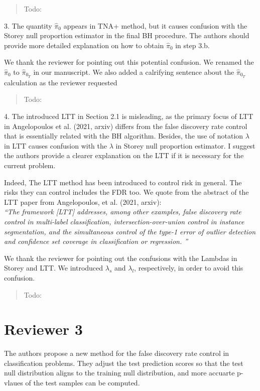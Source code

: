 \documentclass{article}
\newcommand{\response}[1]{\vspace*{1ex} \color{blue} \noindent #1 \color{black}
\vspace*{2ex}}
\newcommand{\edit}[1]{\begin{quotation}\color{red}\noindent #1
\color{black}\end{quotation}}
\begin{document}
\edit{Todo:}

3. The quantity $\hat{\pi}_0$ appears in TNA+ method, but it causes confusion with the Storey null proportion estimator in the final BH procedure.
The authors should provide more detailed explanation on how to obtain $\hat{\pi}_0$ in step 3.b.

\response{We thank the reviewer for pointing out this potential confusion. We renamed the  $\hat{\pi}_0$ to $\hat{\pi}_{0_{T}}$ in our manuscript. We also added a calrifying sentence about the $\hat{\pi}_{0_{T}}$ calculation as the reviewer requested}

\edit{Todo:}

4. The introduced LTT in Section 2.1 is misleading, as the primary focus of LTT in Angelopoulos et al. (2021, arxiv) differs from the false discovery rate control that is essentially related with the BH algorithm.
Besides, the use of notation $\lambda$ in LTT causes confusion with the $\lambda$ in Storey null proportion estimator.
I suggest the authors provide a clearer explanation on the LTT if it is necessary for the current problem.

\response{Indeed, The LTT method has been introduced to control risk in general. The risks they can control includes the FDR too. We quote from the abstract of the LTT paper from Angelopoulos, et al. (2021, arxiv):\\
{\em ``The framework [LTT] addresses, among other examples, false discovery rate control in multi-label classification, intersection-over-union control in instance segmentation, and the simultaneous control of the type-1 error of outlier detection and confidence set coverage in classification or regression. ''}}

\response{We thank the reviewer for pointing out the confusions with the Lambdas in Storey and LTT. We introduced $\lambda_s$ and $\lambda_l$, respectively, in order to avoid this confusion.}

\edit{Todo:}

\section*{Reviewer 3}

The authors propose a new method for the false discovery rate control in classification problems. They adjust the test prediction scores so that the test null distribution
aligns to the training null distribution, and more accuarte p-vlaues of the test samples can be computed.
\end{document}
